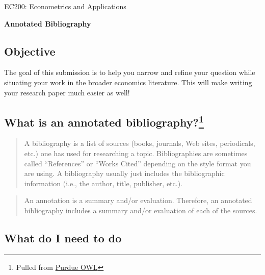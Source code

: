 \documentclass[11pt]{article}
\begin{document}
\thispagestyle{plain}
\singlespacing



EC200: Econometrics and Applications
\begin{center}
\Large{\textbf{Annotated Bibliography}}\\
\end{center}
\bigskip



\hypertarget{objective}{%
\subsection*{Objective}\label{objective}}

The goal of this submission is to help you narrow and refine your
question while situating your work in the broader economics literature.
This will make writing your research paper much easier as well!

\hypertarget{whatis}{%
\subsection*{\texorpdfstring{What is an annotated
bibliography?\footnote{Pulled from
  \href{https://owl.purdue.edu/owl/general_writing/common_writing_assignments/annotated_bibliographies/index.html}{Purdue
  OWL}}}{What is an annotated bibliography?}}\label{whatis}}

\begin{quote}
A bibliography is a list of sources (books, journals, Web sites,
periodicals, etc.) one has used for researching a topic. Bibliographies
are sometimes called ``References'' or ``Works Cited'' depending on the
style format you are using. A bibliography usually just includes the
bibliographic information (i.e., the author, title, publisher, etc.).
\end{quote}

\begin{quote}
An annotation is a summary and/or evaluation. Therefore, an annotated
bibliography includes a summary and/or evaluation of each of the
sources.
\end{quote}

\hypertarget{mission}{%
\subsection*{What do I need to do}\label{mission}}
\end{document}
